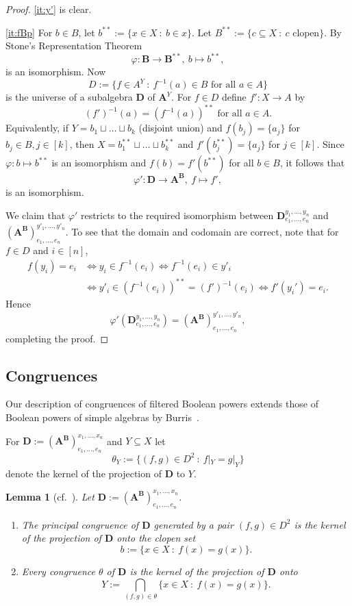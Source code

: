 \documentclass[12pt,a4paper,reqno]{amsart}
\numberwithin{equation}{section}
\theoremstyle{plain}
\newtheorem{lem}[thm]{Lemma}
\theoremstyle{definition}
\newcommand{\A}{\mathbf{A}}
\newcommand{\ABxe}{(\mathbf{A^B})^{x_1,\dots,x_n}_{e_1,\dots,e_n}}
\newcommand{\B}{\mathbf{B}}
\newcommand{\D}{\mathbf{D}}
\newcommand{\st}{\: :\:}
\begin{document}
\begin{proof}
 \eqref{it:y'} is clear.
  
 \eqref{it:fBp} For $b\in B$, let $b^{**} := \{ x\in X \st b\in x \}$. Let $B^{**} := \{ c\subseteq X \st c \text{ clopen} \}$.
 By Stone's Representation Theorem
 \[ \varphi\colon \B\to\B^{**},\ b \mapsto b^{**}, \]
 is an isomorphism. Now
\[ D := \{ f\in A^Y \st f^{-1}(a)\in B \text{ for all } a\in A \} \]
is the universe of a subalgebra $\D$ of $\A^Y$.
 For $f\in D$ define $f'\colon X \to A$ by
\[ (f')^{-1}(a) = (f^{-1}(a))^{**} \text{ for all } a\in A. \]
 Equivalently, if $Y = b_1\sqcup \dots\sqcup b_k$ (disjoint union) and $f(b_j) = \{a_j\}$ for $b_j\in B, j\in [k]$, then
 $X = b^{**}_1\sqcup \dots\sqcup b^{**}_k$ and $f'(b^{**}_j) = \{a_j\}$ for $j\in [k]$. 
 Since $\varphi\colon b\mapsto b^{**}$ is an isomorphism and $f(b)=f'(b^{**})$ for all $b\in B$,
 it follows that
\[ \varphi'\colon \D \to \A^\B,\ f\mapsto f', \]
is an isomorphism.
 
  We claim that $\varphi'$ restricts to the required isomorphism between
 $\D^{y_1,\dots,y_n}_{e_1,\dots,e_n}$ and $(\A^\B)^{y'_1,\dots,y'_n}_{e_1,\dots,e_n}$. To see that 
 the domain and codomain are correct,
 note that for $f \in D$ and $i\in [n]$,
\begin{align*} f(y_i) = e_i &\Leftrightarrow y_i\in f^{-1}(e_i) \Leftrightarrow  f^{-1}(e_i) \in y'_i\\
& \Leftrightarrow y'_i\in (f^{-1}(e_i))^{**} = (f')^{-1}(e_i)
 \Leftrightarrow f'(y_i') = e_i.
\end{align*}
 Hence 
 \[ \varphi'(\D^{y_1,\dots,y_n}_{e_1,\dots,e_n})  =  (\A^\B)^{y'_1,\dots,y'_n}_{e_1,\dots,e_n}, \]
 completing the proof.
\end{proof}  

 
  
\subsection{Congruences}
 Our description of congruences of filtered Boolean powers extends those of Boolean powers of simple algebras by
 Burris~\cite[Theorem 3.5, Corollary 3.6]{Bu:BP}.

For $\D := \ABxe$ and $Y\subseteq X$ let
\[ \theta_Y := \{ (f,g)\in D^2 \st f|_{Y} = g|_{Y} \} \]
 denote the kernel of the projection of $\D$ to $Y$.

\begin{lem}[{cf.\ {\cite[Theorem 3.5]{Bu:BP}}}] \label{lem:con}
 Let $\D  := \ABxe$.
\begin{enumerate}  
\item \label{it:principal}
  The principal congruence of $\D$ generated by a pair $(f,g)\in D^2$ is the kernel
  of the projection of $\D$ onto
 the clopen set
\[ b:=\{ x\in X \st f(x)=g(x) \}. \]
\item \label{it:con} 
Every congruence $\theta$ of $\D$ is the kernel of the projection of $\D$ onto
 \[ Y := \bigcap_{(f,g)\in\theta} \{ x\in X \st f(x)=g(x) \}. \]
\end{enumerate} 
\end{lem}
\end{document}
